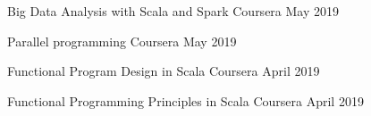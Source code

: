 

\begin{cventries}

  \cventry
  {Big Data Analysis with Scala and Spark}
  {Coursera}
  {}
  {May 2019}
  {}

  \cventry
  {Parallel programming} %
  {Coursera} %
  {} %
  {May 2019} %
  {}

  \cventry
  {Functional Program Design in Scala} %
  {Coursera} %
  {} %
  {April 2019} %
  {}

  \cventry
  {Functional Programming Principles in Scala} %
  {Coursera} %
  {} %
  {April 2019} %
  {}

\end{cventries}

